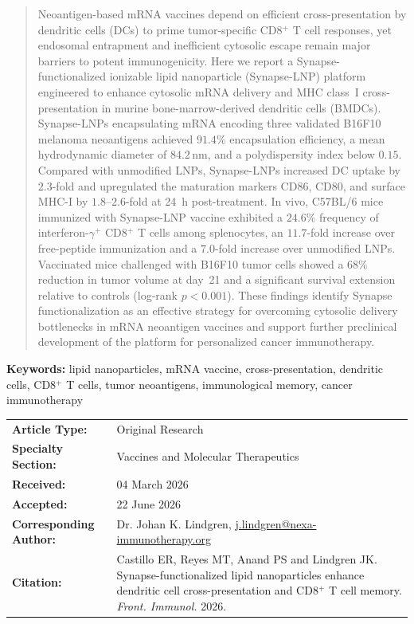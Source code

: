 \begin{abstract}
\noindent
Neoantigen-based mRNA vaccines depend on efficient cross-presentation by dendritic cells (DCs) to prime tumor-specific CD8$^{+}$ T cell responses, yet endosomal entrapment and inefficient cytosolic escape remain major barriers to potent immunogenicity. Here we report a Synapse-functionalized ionizable lipid nanoparticle (Synapse-LNP) platform engineered to enhance cytosolic mRNA delivery and MHC class~I cross-presentation in murine bone-marrow-derived dendritic cells (BMDCs). Synapse-LNPs encapsulating mRNA encoding three validated B16F10 melanoma neoantigens achieved $91.4\%$ encapsulation efficiency, a mean hydrodynamic diameter of $84.2\,\text{nm}$, and a polydispersity index below $0.15$. Compared with unmodified LNPs, Synapse-LNPs increased DC uptake by $2.3$-fold and upregulated the maturation markers CD86, CD80, and surface MHC-I by $1.8$--$2.6$-fold at 24~h post-treatment. In vivo, C57BL/6 mice immunized with Synapse-LNP vaccine exhibited a $24.6\%$ frequency of interferon-$\gamma^{+}$ CD8$^{+}$ T cells among splenocytes, an $11.7$-fold increase over free-peptide immunization and a $7.0$-fold increase over unmodified LNPs. Vaccinated mice challenged with B16F10 tumor cells showed a $68\%$ reduction in tumor volume at day~21 and a significant survival extension relative to controls (log-rank $p < 0.001$). These findings identify Synapse functionalization as an effective strategy for overcoming cytosolic delivery bottlenecks in mRNA neoantigen vaccines and support further preclinical development of the platform for personalized cancer immunotherapy.
\end{abstract}

\begin{keywords-box}
\sffamily\small
\textbf{Keywords:} lipid nanoparticles, mRNA vaccine, cross-presentation, dendritic cells, CD8$^{+}$ T cells, tumor neoantigens, immunological memory, cancer immunotherapy
\end{keywords-box}

\begin{metadata-box}
\begin{spacing}{1.1}
\sffamily\small
\begin{tabularx}{\textwidth}{lX}
\textbf{Article Type:} & Original Research \\
\textbf{Specialty Section:} & Vaccines and Molecular Therapeutics \\
\textbf{Received:} & 04 March 2026 \\
\textbf{Accepted:} & 22 June 2026 \\
\textbf{Corresponding Author:} & Dr. Johan K. Lindgren, \url{j.lindgren@nexa-immunotherapy.org} \\
\textbf{Citation:} & Castillo ER, Reyes MT, Anand PS and Lindgren JK. Synapse-functionalized lipid nanoparticles enhance dendritic cell cross-presentation and CD8$^{+}$ T cell memory. \textit{Front. Immunol.} 2026. \\
\end{tabularx}
\end{spacing}
\end{metadata-box}
